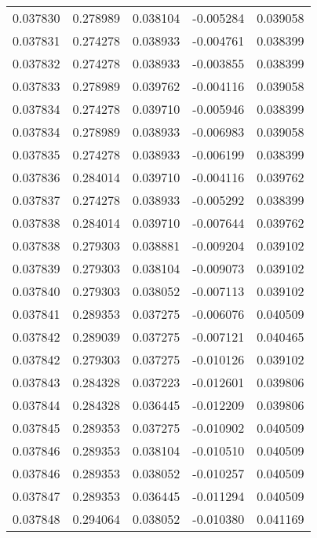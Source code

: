 \begin{tabular}{lrrrr}
0.037830    &  0.278989 &  0.038104 & -0.005284 &             0.039058 \\
0.037831    &  0.274278 &  0.038933 & -0.004761 &             0.038399 \\
0.037832    &  0.274278 &  0.038933 & -0.003855 &             0.038399 \\
0.037833    &  0.278989 &  0.039762 & -0.004116 &             0.039058 \\
0.037834    &  0.274278 &  0.039710 & -0.005946 &             0.038399 \\
0.037834    &  0.278989 &  0.038933 & -0.006983 &             0.039058 \\
0.037835    &  0.274278 &  0.038933 & -0.006199 &             0.038399 \\
0.037836    &  0.284014 &  0.039710 & -0.004116 &             0.039762 \\
0.037837    &  0.274278 &  0.038933 & -0.005292 &             0.038399 \\
0.037838    &  0.284014 &  0.039710 & -0.007644 &             0.039762 \\
0.037838    &  0.279303 &  0.038881 & -0.009204 &             0.039102 \\
0.037839    &  0.279303 &  0.038104 & -0.009073 &             0.039102 \\
0.037840    &  0.279303 &  0.038052 & -0.007113 &             0.039102 \\
0.037841    &  0.289353 &  0.037275 & -0.006076 &             0.040509 \\
0.037842    &  0.289039 &  0.037275 & -0.007121 &             0.040465 \\
0.037842    &  0.279303 &  0.037275 & -0.010126 &             0.039102 \\
0.037843    &  0.284328 &  0.037223 & -0.012601 &             0.039806 \\
0.037844    &  0.284328 &  0.036445 & -0.012209 &             0.039806 \\
0.037845    &  0.289353 &  0.037275 & -0.010902 &             0.040509 \\
0.037846    &  0.289353 &  0.038104 & -0.010510 &             0.040509 \\
0.037846    &  0.289353 &  0.038052 & -0.010257 &             0.040509 \\
0.037847    &  0.289353 &  0.036445 & -0.011294 &             0.040509 \\
0.037848    &  0.294064 &  0.038052 & -0.010380 &             0.041169 \\

\end{tabular}

